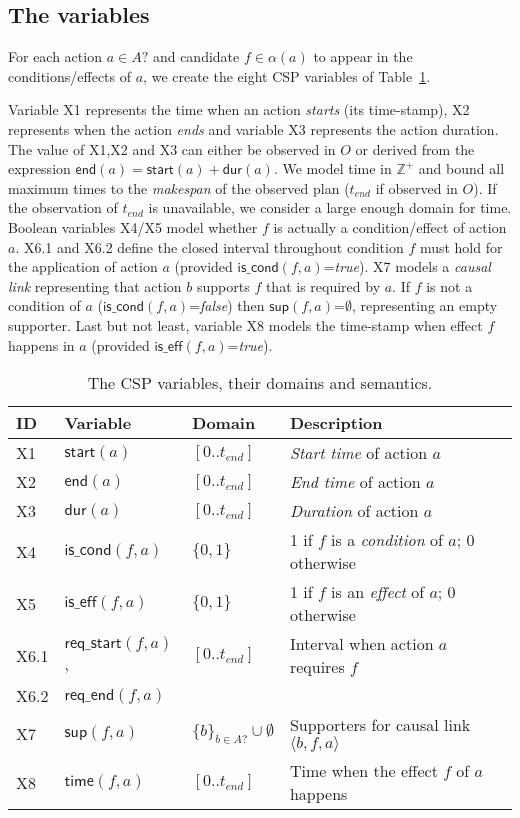 \documentclass{ecai}
\newcommand{\tup}[1]{{\langle #1 \rangle}}
\newcommand{\dur}{\mathsf{dur}}    %
\newcommand{\iscond}{\mathsf{is\_cond}}    %
\newcommand{\iseff}{\mathsf{is\_eff}}    %
\newcommand{\start}{\mathsf{start}}%
\newcommand{\en}{\mathsf{end}}     %
\newcommand{\supp}{\mathsf{sup}}   %
\newcommand{\tim}{\mathsf{time}}   %
\newcommand{\reqs}{\mathsf{req\_{start}}} %
\newcommand{\reqe}{\mathsf{req\_{end}}}   %
\begin{document}
\subsection{The variables}
For each action $a\in A?$ and candidate $f\in\alpha(a)$ to appear in the conditions/effects of $a$, we create the eight CSP variables of Table~\ref{table:variables}. 

Variable X1 represents the time when an action {\em starts} (its time-stamp), X2 represents when the action {\em ends} and variable X3 represents the action duration. The value of X1,X2 and X3 can either be observed in $O$ or derived from the expression $\en(a)=\start(a)+\dur(a)$. We  model time in $\mathbb{Z}^+$ and bound all maximum times to the {\em makespan} of the observed plan ($t_{end}$ if observed in $O$). If the observation of $t_{end}$ is unavailable, we consider a large enough domain for time. Boolean variables X4/X5 model whether $f$ is actually a condition/effect of action $a$. X6.1 and X6.2 define the closed interval throughout condition $f$ must hold for the application of action $a$ (provided $\iscond(f,a)$=\textit{true}). X7 models a {\em causal link} representing that action $b$ supports $f$ that is required by $a$. If $f$ is not a condition of $a$ ($\iscond(f,a)$=\textit{false}) then $\supp(f,a)$=$\emptyset$, representing an empty supporter. Last but not least, variable X8 models the time-stamp when effect $f$ happens in $a$ (provided $\iseff(f,a)$=\textit{true}).

\begin{table}
\begin{center}
\caption{The CSP variables, their domains and semantics.}
\begin{scriptsize}
\begin{tabular}{llll}
\hline	
{\bf ID} & {\bf Variable} & {\bf Domain} & {\bf Description} \\
\hline
X1 &$\start(a)$ & $[0..t_{end}]$ & {\em Start time} of action $a$ \\
X2 &$\en(a)$ & $[0..t_{end}]$ & {\em End time} of action $a$ \\
X3 &$\dur(a)$ & $[0..t_{end}]$ & {\em Duration} of action $a$ \\

X4 &$\iscond(f,a)$ & $\{0,1\}$ & 1 if $f$ is a {\em condition} of $a$; 0 otherwise \\
X5 &$\iseff(f,a)$ & $\{0,1\}$ & 1 if $f$ is an {\em effect} of $a$; 0 otherwise \\

X6.1 &$\reqs(f,a)$, & $[0..t_{end}]$ & Interval when action $a$ requires $f$\\ 
X6.2 &$\reqe(f,a)$  &  & \\

X7 &$\supp(f,a)$ & $\{b\}_{b\in A?} \cup \emptyset $&  Supporters for causal link $\tup{b,f,a}$ \\ 
X8 &$\tim(f,a)$ & $[0..t_{end}]$ & Time when the effect $f$ of $a$ happens
\end{tabular}
\end{scriptsize}
\label{table:variables}
\end{center}
\end{table}
\end{document}
